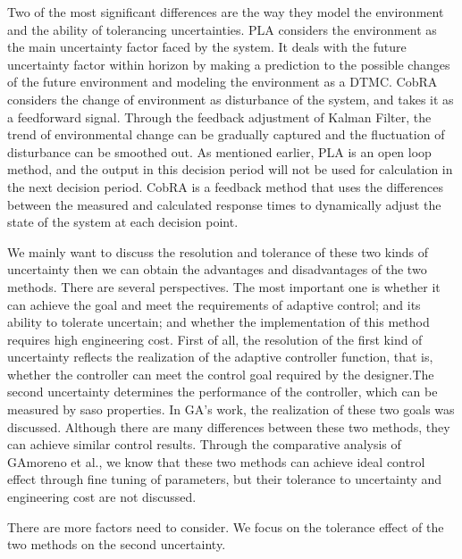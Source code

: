 \documentclass[sigconf]{acmart}
\begin{document}
Two of the most significant differences are the way they model the environment and the ability of tolerancing uncertainties.
PLA considers the environment as the main uncertainty factor faced by the system. It deals with the future uncertainty factor within horizon by making a prediction to the possible changes of the future environment and modeling the environment as a DTMC.
CobRA considers the change of environment as disturbance of the system, and takes it as a feedforward signal. Through the feedback adjustment of Kalman Filter, the trend of environmental change can be gradually captured and the fluctuation of disturbance can be smoothed out.
As mentioned earlier, PLA is an open loop method, and the output in this decision period will not be used for calculation in the next decision period.
CobRA is a feedback method that uses the differences between the measured and calculated response times to dynamically adjust the state of the system at each decision point.

We mainly want to discuss the resolution and tolerance of these two kinds of uncertainty then we can obtain the advantages and disadvantages of the two methods. There are several perspectives. The most important one is whether it can achieve the goal and meet the requirements of adaptive control; and its ability to tolerate uncertain; and whether the implementation of this method requires high engineering cost. First of all, the resolution of the first kind of uncertainty reflects the realization of the adaptive controller function, that is, whether the controller can meet the control goal required by the designer.The second uncertainty determines the performance of the controller, which can be measured by saso properties. In GA's work\cite{plavscobra}, the realization of these two goals was discussed. Although there are many differences between these two methods, they can achieve similar control results. Through the comparative analysis of GAmoreno et al., we know that these two methods can achieve ideal control effect through fine tuning of parameters, but their tolerance to uncertainty and engineering cost are not discussed.

There are more factors need to consider. We focus on the tolerance effect of the two methods on the second uncertainty.
\end{document}
